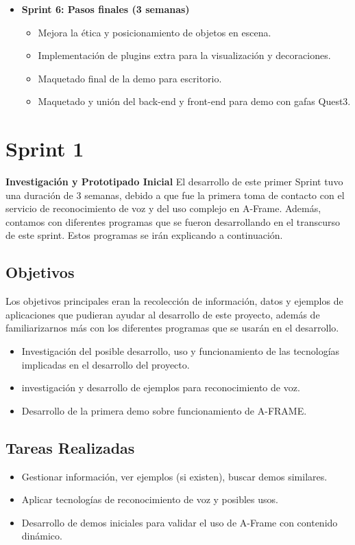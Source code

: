 \documentclass[a4paper, 12pt]{book}
\let\cleardoublepage\clearpage
\begin{document}
\begin{itemize}
 \item \textbf{Sprint 6: Pasos finales (3 semanas)}
 \begin{itemize}
   \item Mejora la ética y posicionamiento de objetos en escena.
   \item Implementación de plugins extra para la visualización y decoraciones.
   \item Maquetado final de la demo para escritorio.
   \item Maquetado y unión del back-end y front-end para demo con gafas Quest3.
 \end{itemize}
\end{itemize}


\cleardoublepage
\section{Sprint 1} 
\label{sec:sprint1}
\textbf{Investigación y Prototipado Inicial}
El desarrollo de este primer Sprint tuvo una duración de 3 semanas, debido a que fue la primera toma de contacto con el servicio de reconocimiento de voz y del uso complejo en A-Frame.
Además, contamos con diferentes programas que se fueron desarrollando en el transcurso de este sprint. Estos programas se irán explicando a continuación. 
\subsection{Objetivos}
Los objetivos principales eran la recolección de información, datos y ejemplos de aplicaciones que pudieran ayudar al desarrollo de este proyecto, además de familiarizarnos más con los diferentes programas que se usarán en el desarrollo.
 \begin{itemize}
   \item Investigación del posible desarrollo, uso y funcionamiento de las tecnologías implicadas en el desarrollo del proyecto.
   \item investigación y desarrollo de ejemplos para reconocimiento de voz.
   \item Desarrollo de la primera demo sobre funcionamiento de A-FRAME.
 \end{itemize}

\subsection{Tareas Realizadas}

\begin{itemize}
 \item Gestionar información, ver ejemplos (si existen), buscar demos similares.
 \item Aplicar tecnologías de reconocimiento de voz y posibles usos.
 \item Desarrollo de demos iniciales para validar el uso de A-Frame con contenido dinámico.
\end{itemize}
\end{document}
